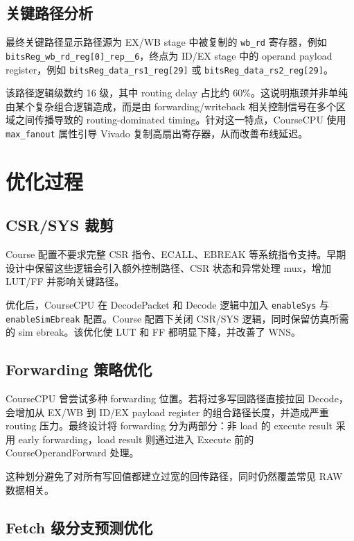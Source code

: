 \documentclass[UTF8,a4paper,12pt]{ctexrep}
\begin{document}
\section{关键路径分析}

最终关键路径显示路径源为 EX/WB stage 中被复制的 \texttt{wb\_rd} 寄存器，例如 \texttt{bitsReg\_wb\_rd\_reg[0]\_rep\_\_6}，终点为 ID/EX stage 中的 operand payload register，例如 \texttt{bitsReg\_data\_rs1\_reg[29]} 或 \texttt{bitsReg\_data\_rs2\_reg[29]}。

该路径逻辑级数约 16 级，其中 routing delay 占比约 60\%。这说明瓶颈并非单纯由某个复杂组合逻辑造成，而是由 forwarding/writeback 相关控制信号在多个区域之间传播导致的 routing-dominated timing。针对这一特点，CourseCPU 使用 \texttt{max\_fanout} 属性引导 Vivado 复制高扇出寄存器，从而改善布线延迟。

\chapter{优化过程}

\section{CSR/SYS 裁剪}

Course 配置不要求完整 CSR 指令、ECALL、EBREAK 等系统指令支持。早期设计中保留这些逻辑会引入额外控制路径、CSR 状态和异常处理 mux，增加 LUT/FF 并影响关键路径。

优化后，CourseCPU 在 DecodePacket 和 Decode 逻辑中加入 \texttt{enableSys} 与 \texttt{enableSimEbreak} 配置。Course 配置下关闭 CSR/SYS 逻辑，同时保留仿真所需的 sim ebreak。该优化使 LUT 和 FF 都明显下降，并改善了 WNS。

\section{Forwarding 策略优化}

CourseCPU 曾尝试多种 forwarding 位置。若将过多写回路径直接拉回 Decode，会增加从 EX/WB 到 ID/EX payload register 的组合路径长度，并造成严重 routing 压力。最终设计将 forwarding 分为两部分：非 load 的 execute result 采用 early forwarding，load result 则通过进入 Execute 前的 CourseOperandForward 处理。

这种划分避免了对所有写回值都建立过宽的回传路径，同时仍然覆盖常见 RAW 数据相关。

\section{Fetch 级分支预测优化}
\end{document}
